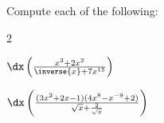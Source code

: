 \begin{ProblemSection}
    \begin{embeddedproblem}{}
      Compute each of  the following:
      \begin{enumerate}[label={\bf{}(\alph*)}]
        \begin{multicols}{2}
        \item $\dx 
          \left(
            \frac{x^3+2x^2}{\inverse{x}+7x^{15}}
          \right)$
        \item $\dx
          \left(
            \frac{(3x^2+2x-1)(4x^8-x^{-9}+2)}{\sqrt{x}+\frac{2}{\sqrt{x}}}
          \right)$
        \end{multicols}
      \end{enumerate}
    \end{embeddedproblem}







\end{ProblemSection}
